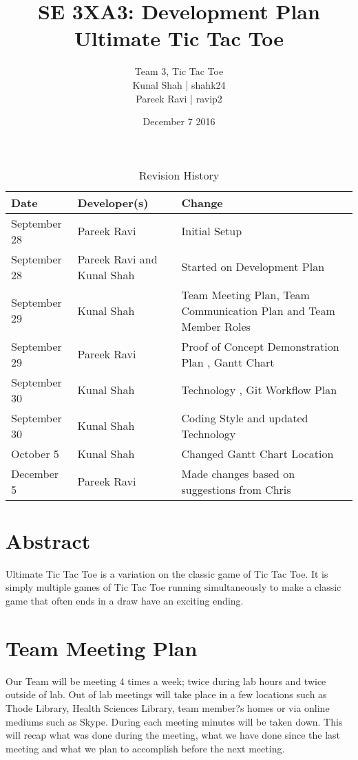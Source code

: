 \documentclass{article}
\title{SE 3XA3: Development Plan\\Ultimate Tic Tac Toe}
\author{Team 3, Tic Tac Toe
		\\ Kunal Shah | shahk24
		\\ Pareek Ravi | ravip2
}
\date{December 7 2016}
\begin{document}
\maketitle

\tableofcontents

\newpage

\begin{table}[hp]
\caption{Revision History} \label{TblRevisionHistory}
\begin{tabularx}{\textwidth}{llX}
\toprule
\textbf{Date} & \textbf{Developer(s)} & \textbf{Change}\\
\midrule
September 28 & Pareek Ravi & Initial Setup\\
September 28 & Pareek Ravi and Kunal Shah & Started on Development Plan\\
September 29 & Kunal Shah & Team Meeting Plan, Team Communication Plan and Team Member Roles\\
September 29 & Pareek Ravi & Proof of Concept Demonstration Plan , Gantt Chart\\
September 30 & Kunal Shah & Technology , Git Workflow Plan \\
September 30 & Kunal Shah & Coding Style and updated Technology\\
October 5 & Kunal Shah & Changed Gantt Chart Location\\
December 5 & Pareek Ravi & Made changes based on suggestions from Chris\\

\bottomrule
\end{tabularx}
\end{table}
\newpage

\section*{Abstract}
Ultimate Tic Tac Toe is a variation on the classic game of Tic Tac Toe. It is 
simply multiple games of Tic Tac Toe running simultaneously to make a classic 
game that often ends in a draw have an exciting ending.

\section{Team Meeting Plan}
Our Team will be meeting 4 times a week; twice during lab hours and twice 
outside of lab. Out of lab meetings will take place in a few locations such as
Thode Library, Health Sciences Library, team member?s homes or via online 
 mediums such as Skype. During each meeting minutes will be taken down. 
 This will recap what was done during the meeting, what we have done since the 
last meeting and what we plan to accomplish before the next meeting.
\end{document}
